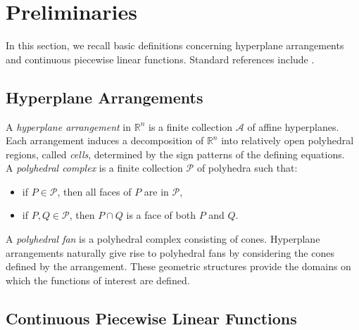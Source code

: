 \documentclass{amsart}
\theoremstyle{definition}
\begin{document}
\section{Preliminaries}\label{sec:prelim}

In this section, we recall basic definitions concerning hyperplane arrangements and continuous piecewise linear functions. Standard references include \cite{stanley2007,ziegler2012}.

\subsection{Hyperplane Arrangements}

A \emph{hyperplane arrangement} in $\mathbb{R}^n$ is a finite collection $\mathcal{A}$ of affine hyperplanes. Each arrangement induces a decomposition of $\mathbb{R}^n$ into relatively open polyhedral regions, called \emph{cells}, determined by the sign patterns of the defining equations.\\
\noindent
A \emph{polyhedral complex} is a finite collection $\mathcal{P}$ of polyhedra such that:
\begin{itemize}
\item if $P \in \mathcal{P}$, then all faces of $P$ are in $\mathcal{P}$,
\item if $P, Q \in \mathcal{P}$, then $P \cap Q$ is a face of both $P$ and $Q$.
\end{itemize}
\noindent
A \emph{polyhedral fan} is a polyhedral complex consisting of cones. Hyperplane arrangements naturally give rise to polyhedral fans by considering the cones defined by the arrangement. These geometric structures provide the domains on which the functions of interest are defined.

\subsection{Continuous Piecewise Linear Functions}
\end{document}
